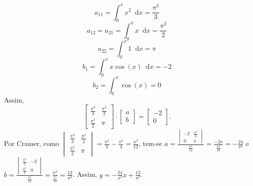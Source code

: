 \documentclass[12pt,a4paper]{article}
\newcommand*\diff{\mathop{}\!\mathrm{d}}
\begin{document}
\begin{enumerate}
\begin{enumerate}
   \[
      a_{11} = \int_0^\pi x^2 \diff{x} = \frac{\pi^3}{3}
   \]
   \[
      a_{12} = a_{21} = \int_0^\pi x \diff{x} = \frac{\pi^2}{2}
   \]
   \[
      a_{22} = \int_0^\pi 1 \diff{x} = \pi
   \]
   \[
      b_1 = \int_0^\pi x\cos(x) \diff{x} = -2
   \]
   \[
      b_2 = \int_0^\pi \cos(x) = 0
   \]
   Assim,
   \[
      \begin{bmatrix}
         \frac{\pi^3}{3} & \frac{\pi^2}{2} \\
         \frac{\pi^2}{2} & \pi
      \end{bmatrix}
      \cdot
      \begin{bmatrix}
         a \\
         b
      \end{bmatrix}
      =
      \begin{bmatrix}
         -2 \\
         0
      \end{bmatrix}.
   \]
   Por Cramer, como $\begin{vmatrix}
      \frac{\pi^3}{3} & \frac{\pi^2}{2} \\
      \frac{\pi^2}{2} & \pi
   \end{vmatrix} = \frac{\pi^4}{3} - \frac{\pi^4}{4} = \frac{\pi^4}{12}$, tem-se $a = \frac{\begin{vmatrix}
      -2 & \frac{\pi^2}{2} \\
      0 & \pi
   \end{vmatrix}}{\frac{\pi^4}{12}} = \frac{-2\pi}{\frac{\pi^4}{12}} = -\frac{24}{\pi^3}$ e  $b = \frac{\begin{vmatrix}
      \frac{\pi^3}{3} & -2 \\
      \frac{\pi^2}{2} & 0
   \end{vmatrix}}{\frac{\pi^4}{12}} = \frac{\pi^2}{\frac{\pi^4}{12}} = \frac{12}{\pi^2}$. Assim, $y = -\frac{24}{\pi^3} x + \frac{12}{\pi^2}$.
\end{enumerate}
\end{enumerate}
\end{document}
